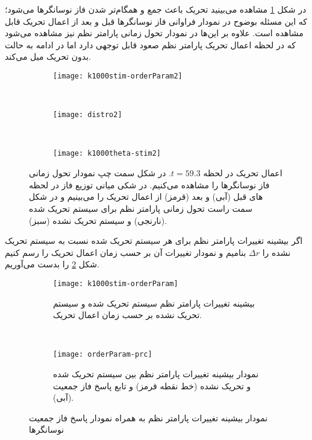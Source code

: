 در شکل \ref{fig:stim593} مشاهده می‌بینید تحریک باعث جمع و همگام‌تر شدن فاز نوسانگرها می‌شود؛ که این مسئله بوضوح در نمودار فراوانی فاز نوسانگرها قبل و بعد از اعمال تحریک قابل مشاهده است. علاوه بر این‌ها در نمودار تحول زمانی پارامتر نظم نیز مشاهده می‌شود که در لحظه اعمال تحریک پارامتر نظم صعود قابل توجهی دارد اما در ادامه به حالت بدون تحریک میل می‌کند.

\begin{figure}
     \centering
     \begin{subfigure}[t]{0.3\textwidth}
         \centering
         \texttt{[image: k1000stim-orderParam2]}
     \end{subfigure}
     \
     \begin{subfigure}[t]{0.2\textwidth}
         \centering
         \texttt{[image: distro2]}
     \end{subfigure}
     \
     \begin{subfigure}[t]{0.4\textwidth}
         \centering
         \texttt{[image: k1000theta-stim2]}
     \end{subfigure}
        \caption{
اعمال تحریک در لحظه 
$t=59.3$.
در شکل سمت چپ نمودار تحول زمانی فاز نوسانگرها را مشاهده می‌کنیم. در شکی میانی توزیع فاز در لحظه های قبل (آبی) و بعد (قرمز) از اعمال تحریک را می‌بینیم و در شکل سمت راست تحول زمانی پارامتر نظم برای سیستم تحریک شده (نارنجی) و سیستم تحریک نشده  (سبز).
         }
        \label{fig:stim593}
\end{figure}

اگر بیشینه تغییرات پارامتر نظم برای هر سیستم تحریک شده نسبت به سیستم تحریک نشده را 
$\Delta r$
بنامیم و نمودار تغییرات آن بر حسب زمان اعمال تحریک را رسم کنیم شکل 
\ref{fig:orderparam-stim}
را بدست می‌آوریم.





\begin{figure}
     \centering
     \begin{subfigure}[t]{0.4\textwidth}
         \centering
         \texttt{[image: k1000stim-orderParam]}
         \caption{
بیشینه تغییرات پارامتر نظم سیستم تحریک شده و سیستم تحریک نشده بر حسب زمان اعمال تحریک.
}
         \label{fig:orderparam-stim}
     \end{subfigure}
     \
     \begin{subfigure}[t]{0.4\textwidth}
         \centering
         \texttt{[image: orderParam-prc]}
         \caption{
نمودار بیشینه تغییرات پارامتر نظم بین سیستم تحریک شده و تحریک نشده (خط نقطه قرمز) و تابع پاسخ فاز جمعیت (آبی).
 }
     \end{subfigure}

        \caption{
نمودار بیشینه تغییرات پارامتر نظم به همراه نمودار پاسخ فاز جمعیت نوسانگرها
         }
\end{figure}

